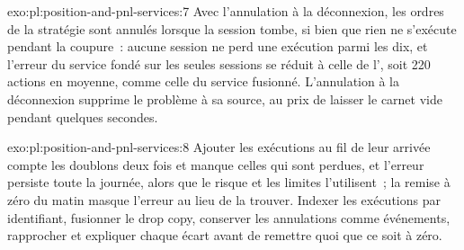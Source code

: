 \begin{solution}{exo:pl:position-and-pnl-services:7}
Avec l'annulation à la déconnexion, les ordres de la stratégie sont annulés lorsque la session tombe, si bien que rien ne s'exécute pendant la coupure~: aucune session ne perd une
exécution parmi les dix, et l'erreur du service fondé sur les seules sessions se réduit à celle de l', soit 220 actions en moyenne, comme celle du service fusionné.
L'annulation à la déconnexion supprime le problème à sa source, au prix de laisser le carnet vide pendant quelques secondes.
\end{solution}

\begin{solution}{exo:pl:position-and-pnl-services:8}
Ajouter les exécutions au fil de leur arrivée compte les doublons deux fois et manque celles qui sont perdues, et l'erreur persiste toute la journée,
alors que le risque et les limites l'utilisent~; la remise à zéro du matin masque l'erreur au lieu de la trouver. Indexer les exécutions par identifiant,
fusionner le drop copy, conserver les annulations comme événements, rapprocher et expliquer chaque écart avant de remettre quoi que ce soit à zéro.
\end{solution}

